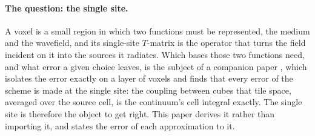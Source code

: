 \documentclass[11pt,a4paper]{article}
\begin{document}
\paragraph{The question: the single site.} A voxel is a small region in which two functions must be
represented, the medium and the wavefield, and its single-site $T$-matrix is the operator that turns the
field incident on it into the sources it radiates. Which bases those two functions need, and what error a
given choice leaves, is the subject of a companion paper \citep{NestorError2026}, which isolates the error
exactly on a layer of voxels and finds that every error of the scheme is made at the single site: the
coupling between cubes that tile space, averaged over the source cell, is the continuum's cell integral
exactly. The single site is therefore the object to get right. This paper derives it rather than importing
it, and states the error of each approximation to it.
\end{document}
